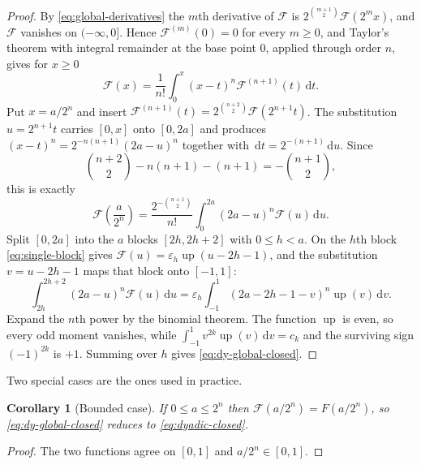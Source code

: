 \documentclass[11pt,oneside]{article}
\newtheorem{corollary}[theorem]{Corollary}
\theoremstyle{definition}
\theoremstyle{remark}
\newcommand{\Up}{\operatorname{up}}
\newcommand{\dd}{\,\mathrm d}
\begin{document}
\begin{proof}
By \eqref{eq:global-derivatives} the $m$th derivative of $\mathcal F$ is
$2^{\binom{m+1}{2}}\mathcal F(2^mx)$, and $\mathcal F$ vanishes on $(-\infty,0]$.  Hence
$\mathcal F^{(m)}(0)=0$ for every $m\ge0$, and Taylor's theorem with integral remainder at
the base point $0$, applied through order $n$, gives for $x\ge0$
\begin{equation}
 \mathcal F(x)=\frac1{n!}\int_0^x(x-t)^n\mathcal F^{(n+1)}(t)\dd t.
                                                               \label{eq:dy-global-taylor}
\end{equation}
Put $x=a/2^n$ and insert $\mathcal F^{(n+1)}(t)=2^{\binom{n+2}{2}}\mathcal F(2^{n+1}t)$.
The substitution $u=2^{n+1}t$ carries $[0,x]$ onto $[0,2a]$ and produces
$(x-t)^n=2^{-n(n+1)}(2a-u)^n$ together with $\dd t=2^{-(n+1)}\dd u$.  Since
\begin{equation*}
 \binom{n+2}{2}-n(n+1)-(n+1)=-\binom{n+1}{2},
\end{equation*}
this is exactly
\begin{equation}
 \mathcal F\!\left(\frac a{2^n}\right)
 =\frac{2^{-\binom{n+1}{2}}}{n!}\int_0^{2a}(2a-u)^n\mathcal F(u)\dd u.
                                                               \label{eq:dy-global-integral}
\end{equation}
Split $[0,2a]$ into the $a$ blocks $[2h,2h+2]$ with $0\le h<a$.  On the $h$th block
\eqref{eq:single-block} gives $\mathcal F(u)=\varepsilon_h\Up(u-2h-1)$, and the
substitution $v=u-2h-1$ maps that block onto $[-1,1]$:
\begin{equation*}
 \int_{2h}^{2h+2}(2a-u)^n\mathcal F(u)\dd u
 =\varepsilon_h\int_{-1}^{1}(2a-2h-1-v)^n\Up(v)\dd v.
\end{equation*}
Expand the $n$th power by the binomial theorem.  The function $\Up$ is even, so every odd
moment vanishes, while $\int_{-1}^1v^{2k}\Up(v)\dd v=c_k$ and the surviving sign
$(-1)^{2k}$ is $+1$.  Summing over $h$ gives \eqref{eq:dy-global-closed}.
\end{proof}

Two special cases are the ones used in practice.

\begin{corollary}[Bounded case]
\label{cor:dy-bounded-case}
If $0\le a\le2^n$ then $\mathcal F(a/2^n)=F(a/2^n)$, so \eqref{eq:dy-global-closed}
reduces to \eqref{eq:dyadic-closed}.
\end{corollary}

\begin{proof}
The two functions agree on $[0,1]$ and $a/2^n\in[0,1]$.
\end{proof}
\end{document}
